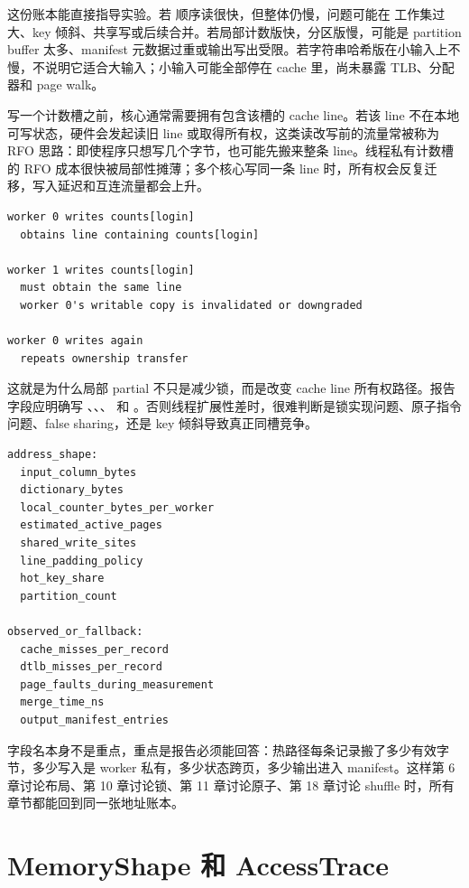 这份账本能直接指导实验。若  顺序读很快，但整体仍慢，问题可能在  工作集过大、key 倾斜、共享写或后续合并。若局部计数版快，分区版慢，可能是 partition buffer 太多、manifest 元数据过重或输出写出受限。若字符串哈希版在小输入上不慢，不说明它适合大输入；小输入可能全部停在 cache 里，尚未暴露 TLB、分配器和 page walk。

写一个计数槽之前，核心通常需要拥有包含该槽的 cache line。若该 line 不在本地可写状态，硬件会发起读旧 line 或取得所有权，这类读改写前的流量常被称为 RFO 思路：即使程序只想写几个字节，也可能先搬来整条 line。线程私有计数槽的 RFO 成本很快被局部性摊薄；多个核心写同一条 line 时，所有权会反复迁移，写入延迟和互连流量都会上升。

\begin{lstlisting}[numbers=none,caption={共享计数槽的硬件事实}]
worker 0 writes counts[login]
  obtains line containing counts[login]

worker 1 writes counts[login]
  must obtain the same line
  worker 0's writable copy is invalidated or downgraded

worker 0 writes again
  repeats ownership transfer
\end{lstlisting}

这就是为什么局部 partial 不只是减少锁，而是改变 cache line 所有权路径。报告字段应明确写 、、、 和 。否则线程扩展性差时，很难判断是锁实现问题、原子指令问题、false sharing，还是 key 倾斜导致真正同槽竞争。

\begin{lstlisting}[numbers=none,caption={聚合地址报告字段}]
address_shape:
  input_column_bytes
  dictionary_bytes
  local_counter_bytes_per_worker
  estimated_active_pages
  shared_write_sites
  line_padding_policy
  hot_key_share
  partition_count

observed_or_fallback:
  cache_misses_per_record
  dtlb_misses_per_record
  page_faults_during_measurement
  merge_time_ns
  output_manifest_entries
\end{lstlisting}

字段名本身不是重点，重点是报告必须能回答：热路径每条记录搬了多少有效字节，多少写入是 worker 私有，多少状态跨页，多少输出进入 manifest。这样第 6 章讨论布局、第 10 章讨论锁、第 11 章讨论原子、第 18 章讨论 shuffle 时，所有章节都能回到同一张地址账本。

\section{MemoryShape 和 AccessTrace}

